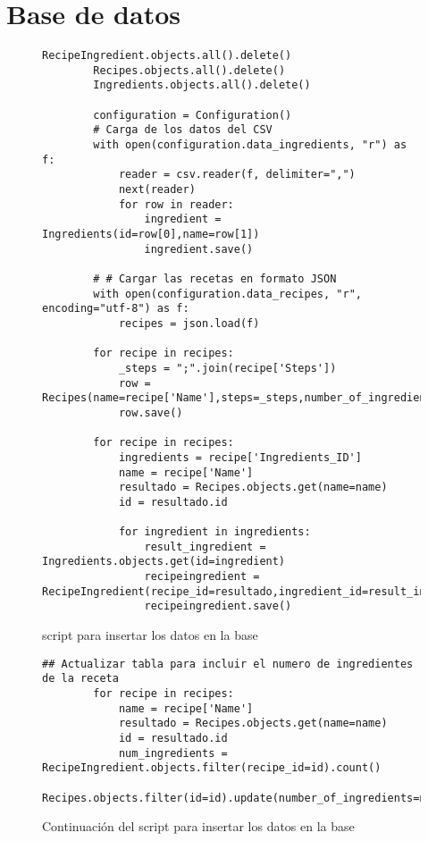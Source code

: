\chapter{Base de datos}
\begin{figure}[H]
    \begin{lstlisting}[style=python]
        RecipeIngredient.objects.all().delete()
        Recipes.objects.all().delete()
        Ingredients.objects.all().delete()
        
        configuration = Configuration()
        # Carga de los datos del CSV
        with open(configuration.data_ingredients, "r") as f:
            reader = csv.reader(f, delimiter=",")
            next(reader)
            for row in reader:
                ingredient = Ingredients(id=row[0],name=row[1])
                ingredient.save()
        
        # # Cargar las recetas en formato JSON
        with open(configuration.data_recipes, "r", encoding="utf-8") as f:
            recipes = json.load(f)
        
        for recipe in recipes:
            _steps = ";".join(recipe['Steps'])
            row = Recipes(name=recipe['Name'],steps=_steps,number_of_ingredients=None)
            row.save()
        
        for recipe in recipes:
            ingredients = recipe['Ingredients_ID']
            name = recipe['Name']
            resultado = Recipes.objects.get(name=name)
            id = resultado.id
        
            for ingredient in ingredients:
                result_ingredient = Ingredients.objects.get(id=ingredient)
                recipeingredient = RecipeIngredient(recipe_id=resultado,ingredient_id=result_ingredient)
                recipeingredient.save()
    \end{lstlisting}
    \caption{\Gls{script} para insertar los datos en la \gls{base}}
    \label{sni:insertar}
\end{figure}

\begin{figure}[H]
    \begin{lstlisting}[style=python]
        ## Actualizar tabla para incluir el numero de ingredientes de la receta
        for recipe in recipes:
            name = recipe['Name']
            resultado = Recipes.objects.get(name=name)
            id = resultado.id
            num_ingredients = RecipeIngredient.objects.filter(recipe_id=id).count()
            Recipes.objects.filter(id=id).update(number_of_ingredients=num_ingredients)
    \end{lstlisting}
    \caption{Continuación del \Gls{script} para insertar los datos en la \gls{base}}
    \label{sni:insertar-continuacion}
\end{figure}


